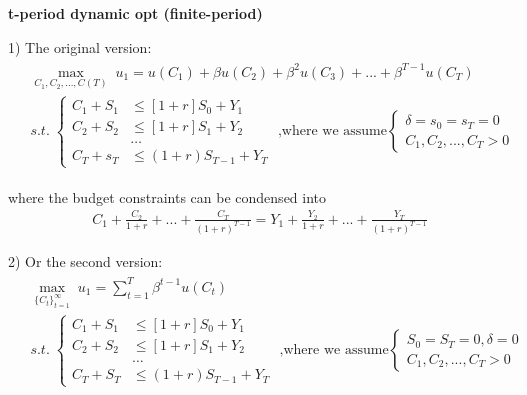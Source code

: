 \documentclass{article}
\begin{document}
\textbf{t-period dynamic opt (finite-period)} 

1) The original version:
\begin{align}
\begin{split}
&\mathop{max}_{C_{1},C_{2},...,C(T)} \; u_{1}=u(C_{1})+\beta u(C_{2})+\beta^{2}u(C_{3})+...+\beta^{T-1}u(C_{T})
\\&s.t. \; \begin{cases}
C_{1}+S_{1} &\leqslant [1+r]S_{0} +Y_{1} \\
C_{2}+S_{2} &\leqslant [1+r]S_{1}+Y_{2} \\
&\dots\\
C_{T}+s_{T}&\leqslant(1+r)S_{T-1}+Y_{T} \end{cases}\text{ ,where we assume}\begin{cases}
\delta=s_{0}=s_{T}=0 \\
C_{1},C_{2},...,C_{T}>0\end{cases} 
\end{split}
\end{align}

where the budget constraints can be condensed into 
\begin{align}
C_{1}+\frac{C_{2}}{1+r}+...+\frac{C_{T}}{(1+r)^{T-1}}=Y_{1}+\frac{Y_{2}}{1+r}+...+\frac{Y_{T}}{(1+r)^{T-1}} 
\end{align}

2) Or the second version:
\begin{align}
\begin{split}
&\mathop{max}_{\{C_{t}\}^{\infty}_{t=1}} \; u_{1}=\sum\limits_{t=1}^{T}\beta^{t-1}u(C_{t})
\\&s.t. \; \begin{cases}
C_{1}+S_{1} &\leqslant [1+r]S_{0} +Y_{1} \\
C_{2}+S_{2} &\leqslant [1+r]S_{1}+Y_{2} \\
&\dots\\
C_{T}+S_{T}&\leqslant(1+r)S_{T-1}+Y_{T} \end{cases}\text{ ,where we assume}\begin{cases}
S_{0}=S_{T}=0, \delta=0 \\
C_{1},C_{2},...,C_{T}>0\end{cases} 
\end{split}
\end{align}
\end{document}

